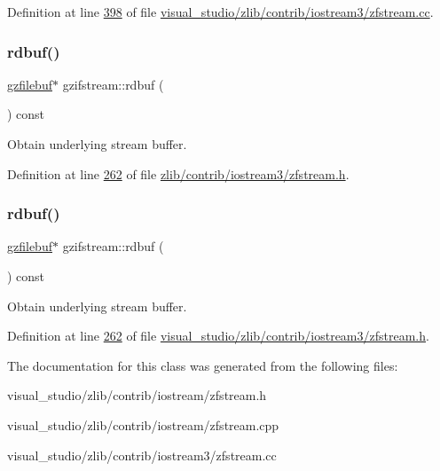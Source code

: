 Definition at line \hyperlink{visual__studio_2zlib_2contrib_2iostream3_2zfstream_8cc_source_l00398}{398} of file \hyperlink{visual__studio_2zlib_2contrib_2iostream3_2zfstream_8cc_source}{visual\+\_\+studio/zlib/contrib/iostream3/zfstream.\+cc}.

\mbox{\label{classgzifstream_a1c5a0ab4f99f8d8e3406af7bfd82b133}} 
\subsubsection{\texorpdfstring{rdbuf()}{rdbuf()}\hspace{0.1cm}{\footnotesize\ttfamily [1/2]}}
{\footnotesize\ttfamily \hyperlink{classgzfilebuf}{gzfilebuf}$\ast$ gzifstream\+::rdbuf (\begin{DoxyParamCaption}{ }\end{DoxyParamCaption}) const\hspace{0.3cm}{\ttfamily [inline]}}

Obtain underlying stream buffer. 

Definition at line \hyperlink{zlib_2contrib_2iostream3_2zfstream_8h_source_l00262}{262} of file \hyperlink{zlib_2contrib_2iostream3_2zfstream_8h_source}{zlib/contrib/iostream3/zfstream.\+h}.

\mbox{\label{classgzifstream_a1c5a0ab4f99f8d8e3406af7bfd82b133}} 
\subsubsection{\texorpdfstring{rdbuf()}{rdbuf()}\hspace{0.1cm}{\footnotesize\ttfamily [2/2]}}
{\footnotesize\ttfamily \hyperlink{classgzfilebuf}{gzfilebuf}$\ast$ gzifstream\+::rdbuf (\begin{DoxyParamCaption}{ }\end{DoxyParamCaption}) const\hspace{0.3cm}{\ttfamily [inline]}}

Obtain underlying stream buffer. 

Definition at line \hyperlink{visual__studio_2zlib_2contrib_2iostream3_2zfstream_8h_source_l00262}{262} of file \hyperlink{visual__studio_2zlib_2contrib_2iostream3_2zfstream_8h_source}{visual\+\_\+studio/zlib/contrib/iostream3/zfstream.\+h}.



The documentation for this class was generated from the following files\+:\begin{DoxyCompactItemize}
\item 
visual\+\_\+studio/zlib/contrib/iostream/zfstream.\+h\item 
visual\+\_\+studio/zlib/contrib/iostream/zfstream.\+cpp\item 
visual\+\_\+studio/zlib/contrib/iostream3/zfstream.\+cc\end{DoxyCompactItemize}
